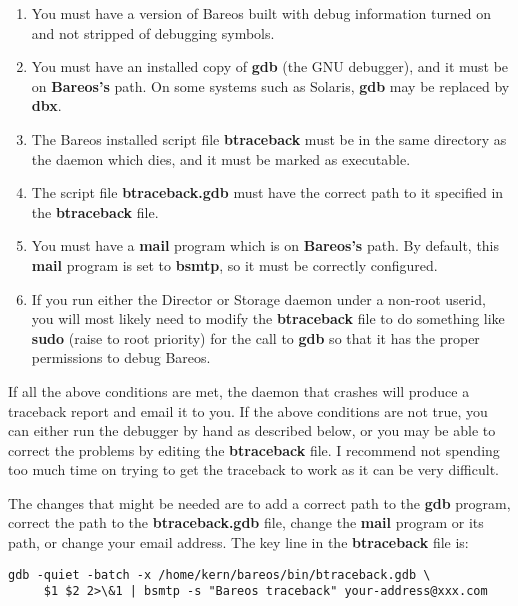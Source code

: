 \begin{enumerate}
\item You must have a version of Bareos built with debug information turned
   on and not stripped of debugging symbols.

\item You must have an installed copy of {\bf gdb} (the GNU debugger),  and it
   must be on {\bf Bareos's} path. On some systems such as Solaris, {\bf
   gdb} may be replaced by {\bf dbx}.

\item The Bareos installed script file {\bf btraceback} must  be in the same
   directory as the daemon which dies, and it must  be marked as executable.

\item The script file {\bf btraceback.gdb} must  have the correct  path to it
   specified in the {\bf btraceback} file.

\item You must have a {\bf mail} program which is on {\bf Bareos's}  path.
   By default, this {\bf mail} program is set to {\bf bsmtp}, so it must
   be correctly configured.

\item If you run either the Director or Storage daemon under a non-root
   userid, you will most likely need to modify the {\bf btraceback} file
   to do something like {\bf sudo} (raise to root priority) for the
   call to {\bf gdb} so that it has the proper permissions to debug
   Bareos.
\end{enumerate}

If all the above conditions are met, the daemon that crashes will produce a
traceback report and email it to you. If the above conditions are not true,
you can either run the debugger by hand as described below, or you may be able
to correct the problems by editing the {\bf btraceback} file. I recommend not
spending too much time on trying to get the traceback to work as it can be
very difficult.

The changes that might be needed are to add a correct path to the {\bf gdb}
program, correct the path to the {\bf btraceback.gdb} file, change the {\bf
mail} program or its path, or change your email address. The key line in the
{\bf btraceback} file is:

\footnotesize
\begin{verbatim}
gdb -quiet -batch -x /home/kern/bareos/bin/btraceback.gdb \
     $1 $2 2>\&1 | bsmtp -s "Bareos traceback" your-address@xxx.com
\end{verbatim}
\normalsize

